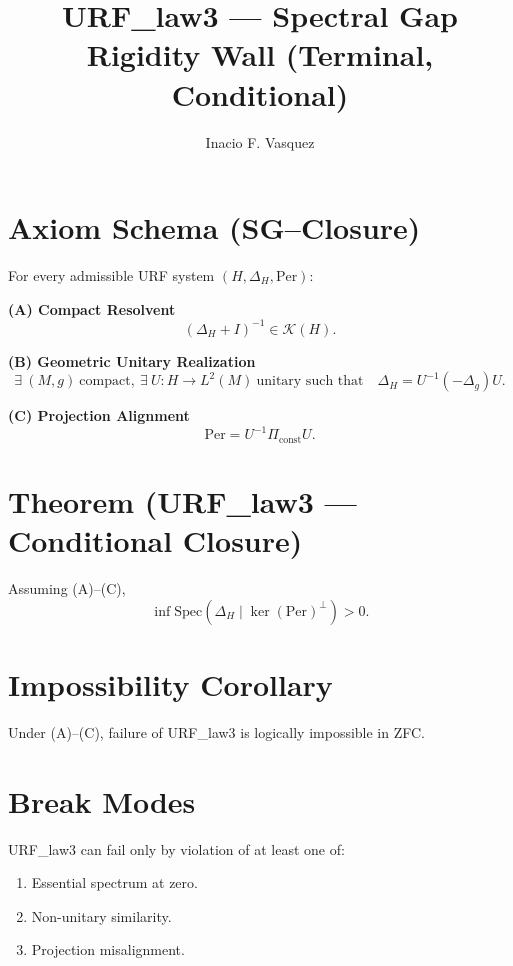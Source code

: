 \documentclass[11pt]{article}
\title{URF\_law3 — Spectral Gap Rigidity Wall (Terminal, Conditional)}
\author{Inacio F. Vasquez}
\date{}
\begin{document}
\maketitle

\section*{Axiom Schema (SG--Closure)}

For every admissible URF system $(H,\Delta_H,\mathrm{Per})$:

\textbf{(A) Compact Resolvent}
\[
(\Delta_H + I)^{-1} \in \mathcal{K}(H).
\]

\textbf{(B) Geometric Unitary Realization}
\[
\exists\ (M,g)\ \text{compact},\ \exists\ U:H\to L^2(M)\ \text{unitary such that}
\quad \Delta_H = U^{-1}(-\Delta_g)U.
\]

\textbf{(C) Projection Alignment}
\[
\mathrm{Per} = U^{-1}\Pi_{\mathrm{const}}U.
\]

\section*{Theorem (URF\_law3 — Conditional Closure)}

Assuming (A)--(C),
\[
\inf \mathrm{Spec}(\Delta_H \mid \ker(\mathrm{Per})^\perp) > 0.
\]

\section*{Impossibility Corollary}

Under (A)--(C), failure of URF\_law3 is logically impossible in ZFC.

\section*{Break Modes}

URF\_law3 can fail only by violation of at least one of:
\begin{enumerate}
\item Essential spectrum at zero.
\item Non-unitary similarity.
\item Projection misalignment.
\end{enumerate}
\end{document}
